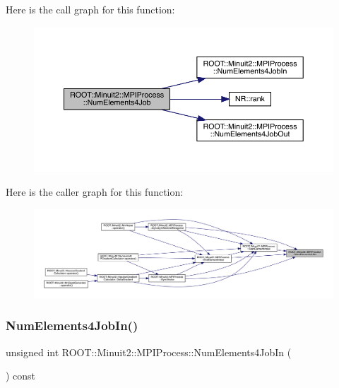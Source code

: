 Here is the call graph for this function\+:
\nopagebreak
\begin{figure}[H]
\begin{center}
\leavevmode
\includegraphics[width=350pt]{dc/d43/classROOT_1_1Minuit2_1_1MPIProcess_a9d9453545f311f9f9f995800ed518258_cgraph}
\end{center}
\end{figure}
Here is the caller graph for this function\+:\nopagebreak
\begin{figure}[H]
\begin{center}
\leavevmode
\includegraphics[width=350pt]{dc/d43/classROOT_1_1Minuit2_1_1MPIProcess_a9d9453545f311f9f9f995800ed518258_icgraph}
\end{center}
\end{figure}
\mbox{\label{classROOT_1_1Minuit2_1_1MPIProcess_ada3f8f6f1b28844db6cb6bd717521ffd}} 
\subsubsection{\texorpdfstring{NumElements4JobIn()}{NumElements4JobIn()}\hspace{0.1cm}{\footnotesize\ttfamily [1/2]}}
{\footnotesize\ttfamily unsigned int R\+O\+O\+T\+::\+Minuit2\+::\+M\+P\+I\+Process\+::\+Num\+Elements4\+Job\+In (\begin{DoxyParamCaption}{ }\end{DoxyParamCaption}) const\hspace{0.3cm}{\ttfamily [inline]}}

